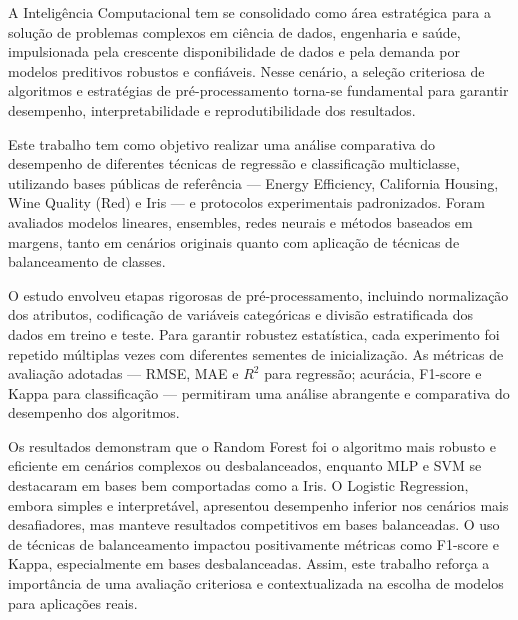 A Inteligência Computacional tem se consolidado como área estratégica para a solução de problemas complexos em ciência de dados, engenharia e saúde, impulsionada pela crescente disponibilidade de dados e pela demanda por modelos preditivos robustos e confiáveis. Nesse cenário, a seleção criteriosa de algoritmos e estratégias de pré-processamento torna-se fundamental para garantir desempenho, interpretabilidade e reprodutibilidade dos resultados.

Este trabalho tem como objetivo realizar uma análise comparativa do desempenho de diferentes técnicas de regressão e classificação multiclasse, utilizando bases públicas de referência — Energy Efficiency, California Housing, Wine Quality (Red) e Iris — e protocolos experimentais padronizados. Foram avaliados modelos lineares, ensembles, redes neurais e métodos baseados em margens, tanto em cenários originais quanto com aplicação de técnicas de balanceamento de classes.

O estudo envolveu etapas rigorosas de pré-processamento, incluindo normalização dos atributos, codificação de variáveis categóricas e divisão estratificada dos dados em treino e teste. Para garantir robustez estatística, cada experimento foi repetido múltiplas vezes com diferentes sementes de inicialização. As métricas de avaliação adotadas — RMSE, MAE e $R^2$ para regressão; acurácia, F1-score e Kappa para classificação — permitiram uma análise abrangente e comparativa do desempenho dos algoritmos.

Os resultados demonstram que o Random Forest foi o algoritmo mais robusto e eficiente em cenários complexos ou desbalanceados, enquanto MLP e SVM se destacaram em bases bem comportadas como a Iris. O Logistic Regression, embora simples e interpretável, apresentou desempenho inferior nos cenários mais desafiadores, mas manteve resultados competitivos em bases balanceadas. O uso de técnicas de balanceamento impactou positivamente métricas como F1-score e Kappa, especialmente em bases desbalanceadas. Assim, este trabalho reforça a importância de uma avaliação criteriosa e contextualizada na escolha de modelos para aplicações reais.
